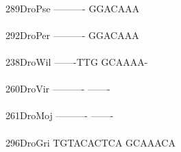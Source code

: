 \documentclass[11pt,twoside,reqno,a4paper]{article}
\begin{document}
{\hspace*{4\charwidth}\hspace*{7\charwidth}\hspace*{1\charwidth}\\
289\hspace*{1\charwidth}DroPse	----------	GGACAAA\\
\hspace*{4\charwidth}\hspace*{7\charwidth}\hspace*{1\charwidth}\\
292\hspace*{1\charwidth}DroPer	----------	GGACAAA\\
\hspace*{4\charwidth}\hspace*{7\charwidth}\hspace*{1\charwidth}\\
238\hspace*{1\charwidth}DroWil	-------TTG	GCAAAA-\\
\hspace*{4\charwidth}\hspace*{7\charwidth}\hspace*{1\charwidth}\\
260\hspace*{1\charwidth}DroVir	----------	-------\\
\hspace*{4\charwidth}\hspace*{7\charwidth}\hspace*{1\charwidth}\\
261\hspace*{1\charwidth}DroMoj	----------	-------\\
\hspace*{4\charwidth}\hspace*{7\charwidth}\hspace*{1\charwidth}\\
296\hspace*{1\charwidth}DroGri	TGTACACTCA	GCAAACA\\
\hspace*{4\charwidth}\hspace*{7\charwidth}\hspace*{1\charwidth}\\
\\
}
\end{document}
